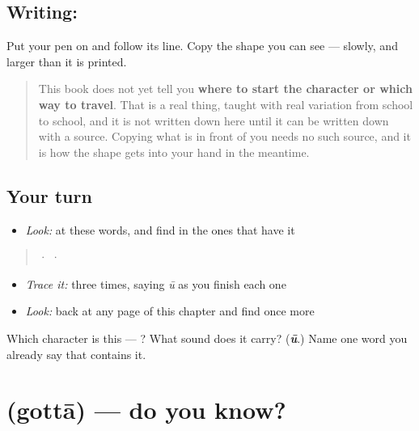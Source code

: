 \subsection*{Writing: }
Put your pen on  and follow its line. Copy the shape you can see — slowly, and larger than it is printed.

\begin{quote}
This book does not yet tell you \textbf{where to start the character or which way to travel}. That is a real thing, taught with real variation from school to school, and it is not written down here until it can be written down with a source. Copying what is in front of you needs no such source, and it is how the shape gets into your hand in the meantime.
\end{quote}

\subsection*{Your turn}
\begin{itemize}
\raggedright
  \item \emph{Look:} at these words, and find  in the ones that have it
\end{itemize}

\begin{quote}
  ·    ·  
\end{quote}

\begin{itemize}
\raggedright
  \item \emph{Trace it:}  three times, saying \emph{ū} as you finish each one
  \item \emph{Look:} back at any page of this chapter and find  once more
\end{itemize}

\begin{tcolorbox}[breakable,colback=teal!4,colframe=teal!35!black,title={Before you move on}]
Which character is this — ? What sound does it carry? (\emph{\textbf{ū}}.) Name one word you already say that contains it.
\end{tcolorbox}
\section[\texorpdfstring{\kn{ಗೊತ್ತಾ} (gottā)}{ಗೊತ್ತಾ (gottā)}]{ (gottā) — do you know?}

\label{lesson:KA-C69-is-it}



